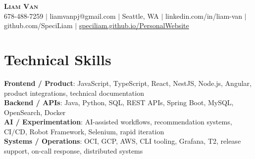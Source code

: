 \documentclass[letterpaper,11pt]{article}
\begin{document}

%
\begin{center}
    \textbf{\Huge \scshape Liam Van} \\ \vspace{1pt}
    \small 678-488-7259 $|$ \small {liamvanpj@gmail.com} $|$ Seattle, WA
 {{$|$ linkedin.com/in/liam-van} {$|$ github.com/SpeciLiam} {$|$ \href{https://speciliam.github.io/PersonalWebsite}{speciliam.github.io/PersonalWebsite}}}

\end{center}

\section{Technical Skills}
 \begin{itemize}[leftmargin=0.15in, label={}]
    \small{\item{
     \textbf{Frontend / Product}{: JavaScript, TypeScript, React, NestJS, Node.js, Angular, product integrations, technical documentation} \\
     \textbf{Backend / APIs}{: Java, Python, SQL, REST APIs, Spring Boot, MySQL, OpenSearch, Docker} \\
     \textbf{AI / Experimentation}{: AI-assisted workflows, recommendation systems, CI/CD, Robot Framework, Selenium, rapid iteration} \\
     \textbf{Systems / Operations}{: OCI, GCP, AWS, CLI tooling, Grafana, T2, release support, on-call response, distributed systems} \\
    }}
 \end{itemize}
%
\end{document}
